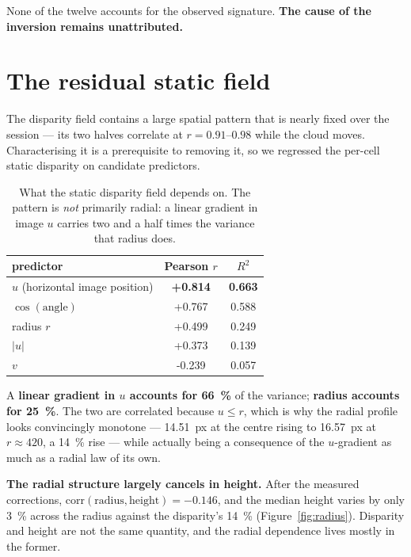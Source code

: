 \documentclass[11pt,a4paper]{article}
\begin{document}
None of the twelve accounts for the observed signature. \textbf{The cause of the inversion
remains unattributed.}

\section{The residual static field}
\label{sec:static}

The disparity field contains a large spatial pattern that is nearly fixed over the session ---
its two halves correlate at $r = 0.91$--$0.98$ while the cloud moves. Characterising it is a
prerequisite to removing it, so we regressed the per-cell static disparity on candidate
predictors.

\begin{table}[t]
\centering
\caption{What the static disparity field depends on. The pattern is \emph{not} primarily
radial: a linear gradient in image $u$ carries two and a half times the variance that radius
does.}
\label{tab:staticfield}
\small
\begin{tabular}{@{}lS[table-format=+1.3]S[table-format=1.3]@{}}
\toprule
predictor & {Pearson $r$} & {$R^2$} \\
\midrule
$u$ (horizontal image position) & \textbf{+0.814} & \textbf{0.663} \\
$\cos(\text{angle})$            & +0.767 & 0.588 \\
radius $r$                      & +0.499 & 0.249 \\
$|u|$                           & +0.373 & 0.139 \\
$v$                             & -0.239 & 0.057 \\
\bottomrule
\end{tabular}
\end{table}

A \textbf{linear gradient in $u$ accounts for \SI{66}{\percent}} of the variance;
\textbf{radius accounts for \SI{25}{\percent}}. The two are correlated because $u \le r$, which
is why the radial profile looks convincingly monotone --- \SI{14.51}{px} at the centre rising
to \SI{16.57}{px} at $r \approx 420$, a \SI{14}{\percent} rise --- while actually being a
consequence of the $u$-gradient as much as a radial law of its own.

\textbf{The radial structure largely cancels in height.} After the measured corrections,
$\mathrm{corr}(\text{radius},\text{height}) = -0.146$, and the median height varies by only
\SI{3}{\percent} across the radius against the disparity's \SI{14}{\percent}
(Figure~\ref{fig:radius}). Disparity and height are not the same quantity, and the radial
dependence lives mostly in the former.
\end{document}
